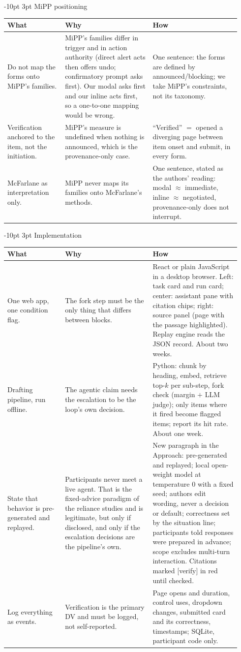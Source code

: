 \documentclass[9pt,letterpaper]{extarticle}
\makeatletter
\newcommand{\rowsep}{\noalign{\vskip 1.5pt}\arrayrulecolor{black!35}\hline\arrayrulecolor{black}\noalign{\vskip 1.5pt}}
\renewcommand\section{\@startsection{section}{1}{\z@}%
  {-10pt \@plus -2pt \@minus -1pt}{3pt}%
  {\sffamily\bfseries\large\color{accent}}}
\let\oldsection\section
\renewcommand{\section}{\needspace{7\baselineskip}\oldsection}
\newcommand{\wwh}{\toprule
\sffamily\bfseries\color{accent} What & \sffamily\bfseries\color{accent} Why & \sffamily\bfseries\color{accent} How \\
\midrule}
\newenvironment{wwhtable}{\footnotesize
\begin{longtable}{@{}>{\raggedright\arraybackslash}p{0.23\linewidth}>{\raggedright\arraybackslash}p{0.355\linewidth}>{\raggedright\arraybackslash}p{0.355\linewidth}@{}}
\wwh}{\bottomrule\end{longtable}}
\makeatother
\begin{document}
\section{MiPP positioning}
\begin{wwhtable}
Do not map the forms onto MiPP's families. &
MiPP's families differ in trigger and in action authority (direct alert acts
then offers undo; confirmatory prompt asks first). Our modal asks first and our
inline acts first, so a one-to-one mapping would be wrong. &
One sentence: the forms are defined by announced/blocking; we take MiPP's
constraints, not its taxonomy. \\
\rowsep
Verification anchored to the item, not the initiation. &
MiPP's measure is undefined when nothing is announced, which is the
provenance-only case. &
``Verified'' $=$ opened a diverging page between item onset and submit, in
every form. \\
\rowsep
McFarlane as interpretation only. &
MiPP never maps its families onto McFarlane's methods. &
One sentence, stated as the authors' reading: modal $\approx$ immediate,
inline $\approx$ negotiated, provenance-only does not interrupt. \\
\end{wwhtable}

\section{Implementation}
\begin{wwhtable}
One web app, one condition flag. &
The fork step must be the only thing that differs between blocks. &
React or plain JavaScript in a desktop browser. Left: task card and run card;
center: assistant pane with citation chips; right: source panel (page with
the passage highlighted). Replay engine reads the JSON record. About two
weeks. \\
\rowsep
Drafting pipeline, run offline. &
The agentic claim needs the escalation to be the loop's own decision. &
Python: chunk by heading, embed, retrieve top-$k$ per sub-step, fork check
(margin $+$ LLM judge); only items where it fired become flagged items;
report its hit rate. About one week. \\
\rowsep
State that behavior is pre-generated and replayed. &
Participants never meet a live agent. That is the fixed-advice paradigm of
the reliance studies and is legitimate, but only if disclosed, and only if
the escalation decisions are the pipeline's own. &
New paragraph in the Approach: pre-generated and replayed; local open-weight
model at temperature 0 with a fixed seed; authors edit wording, never a
decision or default; correctness set by the situation line; participants
told responses were prepared in advance; scope excludes multi-turn
interaction. Citations marked [verify] in red until checked. \\
\rowsep
Log everything as events. &
Verification is the primary DV and must be logged, not self-reported. &
Page opens and duration, control uses, dropdown changes, submitted card and its
correctness, timestamps; SQLite, participant code only. \\
\end{wwhtable}
\end{document}
